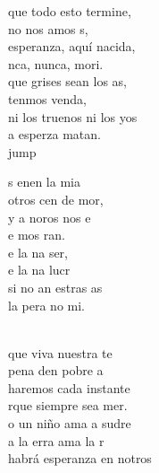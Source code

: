 \begin{cancion}%
	que todo esto termine,\\
	no nos amos s,\\
	esperanza, aquí nacida,\\
	nca, nunca, mori. \\
	que grises sean los as,\\
	tenmos venda,\\
	ni los truenos ni los yos\\
	a esperza matan. \\jump\\
	\begin{chorus}%
	s enen la mia\\
	otros cen de mor,\\
	y a noros  nos e\\
	e mos ran.\\
	e la na ser,\\
	e la na lucr\\
	si no an estras as\\
	la pera no mi.\\
	\end{chorus}%
	\jump\\
	que viva  nuestra te\\
	 pena den pobre a\\
	haremos cada instante\\
	rque siempre sea mer.\\
	o un niño ama a sudre\\
	a la erra ama la r\\
	habrá esperanza en notros\\

\end{cancion}
